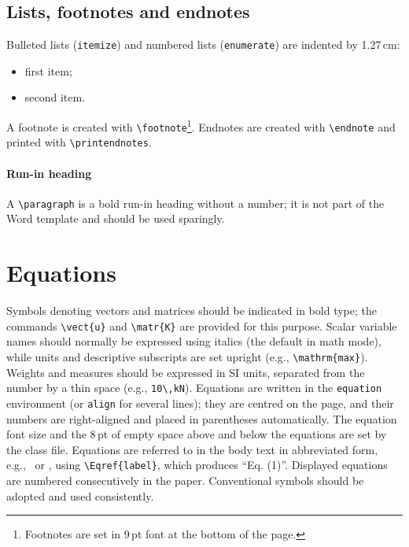 \documentclass{Definitions/CroCEE}
\begin{document}
\subsection{Lists, footnotes and endnotes}

Bulleted lists (\texttt{itemize}) and numbered lists (\texttt{enumerate}) are indented by 1.27\,cm:
\begin{itemize}
  \item first item;
  \item second item.
\end{itemize}

A footnote is created with \texttt{\textbackslash footnote}\footnote{Footnotes are set in 9\,pt font at the bottom of the page.}. Endnotes are created with \texttt{\textbackslash endnote} and printed with \texttt{\textbackslash printendnotes}. \paragraph{Run-in heading} A \texttt{\textbackslash paragraph} is a bold run-in heading without a number; it is not part of the Word template and should be used sparingly.

\section{Equations}

Symbols denoting vectors and matrices should be indicated in bold type; the commands \texttt{\textbackslash vect\{u\}} and \texttt{\textbackslash matr\{K\}} are provided for this purpose. Scalar variable names should normally be expressed using italics (the default in math mode), while units and descriptive subscripts are set upright (e.g., \texttt{\textbackslash mathrm\{max\}}). Weights and measures should be expressed in SI units, separated from the number by a thin space (e.g., \texttt{10\textbackslash,kN}). Equations are written in the \texttt{equation} environment (or \texttt{align} for several lines); they are centred on the page, and their numbers are right-aligned and placed in parentheses automatically. The equation font size and the 8\,pt of empty space above and below the equations are set by the class file. Equations are referred to in the body text in abbreviated form, e.g.,~ or , using \texttt{\textbackslash Eqref\{label\}}, which produces ``Eq. (1)''. Displayed equations are numbered consecutively in the paper. Conventional symbols should be adopted and used consistently.
\end{document}
